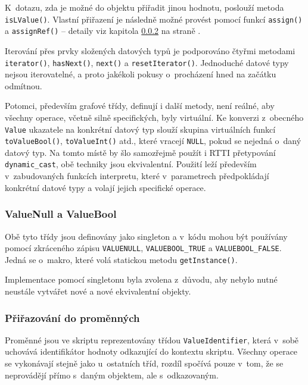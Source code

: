 \documentclass[11pt,twoside,a4paper]{book}
\begin{document}
K~dotazu, zda je možné do objektu přiřadit jinou hodnotu, poslouží metoda \texttt{isLValue()}. Vlastní přiřazení je následně možné provést pomocí funkcí \texttt{assign()} a \texttt{assignRef()} -- detaily viz kapitola \ref{valuereference_a_prirazovani_do_promennych} na straně \pageref{valuereference_a_prirazovani_do_promennych}.

Iterování přes prvky složených datových typů je podporováno čtyřmi metodami \texttt{iterator()}, \texttt{hasNext()}, \texttt{next()} a \texttt{resetIterator()}. Jednoduché datové typy nejsou iterovatelné, a proto jakékoli pokusy o~procházení hned na začátku odmítnou.

Potomci, především grafové třídy, definují i další metody, není reálné, aby všechny operace, včetně silně specifických, byly virtuální. Ke konverzi z~obecného \texttt{Value} ukazatele na konkrétní datový typ slouží skupina virtuálních funkcí \texttt{toValueBool()}, \texttt{toValueInt()} atd., které vracejí \texttt{NULL}, pokud se nejedná o~daný datový typ. Na tomto místě by šlo samozřejmě použít i RTTI přetypování \texttt{dynamic\_cast}, obě techniky jsou ekvivalentní. Použití leží především v~zabudovaných funkcích interpretu, které v~parametrech předpokládají konkrétní datové typy a volají jejich specifické operace.


\subsubsection{ValueNull a ValueBool}

Obě tyto třídy jsou definovány jako singleton a v~kódu mohou být používány pomocí zkrá\-ce\-né\-ho zápisu \texttt{VALUENULL}, \texttt{VALUEBOOL\_TRUE} a \texttt{VALUEBOOL\_FALSE}. Jedná se o~makro, které volá statickou metodu \texttt{getInstance()}.

Implementace pomocí singletonu byla zvolena z~důvodu, aby nebylo nutné neustále vytvářet nové a nové ekvivalentní objekty.


\subsubsection{Přiřazování do proměnných}
\label{valuereference_a_prirazovani_do_promennych}

Proměnné jsou ve skriptu reprezentovány třídou \texttt{ValueIdentifier}, která v~sobě u\-cho\-vá\-vá identifikátor hodnoty odkazující do kontextu skriptu. Všechny operace se vykonávají stejně jako u~ostatních tříd, rozdíl spočívá pouze v~tom, že se neprovádějí přímo s~daným objektem, ale s~odkazovaným.
\end{document}
